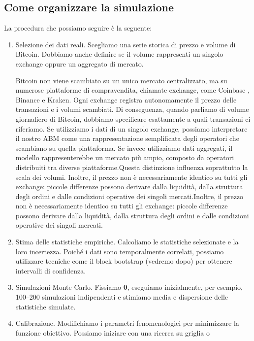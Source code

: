\subsection{Come organizzare la simulazione}
La procedura che possiamo seguire è la seguente:
\begin{enumerate}
    \item Selezione dei dati reali. Scegliamo una serie storica di prezzo e volume di Bitcoin. 
    Dobbiamo anche definire se il volume rappresenti un singolo exchange oppure un aggregato di mercato.
    \begin{approfondimento}
        Bitcoin non viene scambiato su un unico mercato centralizzato, ma su numerose piattaforme di compravendita, chiamate exchange, 
        come Coinbase , Binance e Kraken. Ogni exchange registra autonomamente il prezzo delle transazioni e i volumi scambiati. Di conseguenza, 
        quando parliamo di volume giornaliero di Bitcoin, dobbiamo specificare esattamente a quali transazioni ci riferiamo.
        Se utilizziamo i dati di un singolo exchange, possiamo interpretare il nostro ABM come una rappresentazione semplificata degli operatori che 
        scambiano su quella piattaforma. Se invece utilizziamo dati aggregati, il modello rappresenterebbe un mercato più ampio, composto da 
        operatori distribuiti tra diverse piattaforme.Questa distinzione influenza soprattutto la scala dei volumi.
        Inoltre, il prezzo non è necessariamente identico su tutti gli exchange: piccole differenze possono derivare dalla liquidità, dalla struttura 
        degli ordini e dalle condizioni operative dei singoli mercati.Inoltre, il prezzo non è necessariamente identico su tutti gli exchange: piccole 
        differenze possono derivare dalla liquidità, dalla struttura degli ordini e dalle condizioni operative dei singoli mercati.
    \end{approfondimento}
    \item Stima delle statistiche empiriche. Calcoliamo le statistiche selezionate e la loro incertezza. Poiché i dati sono temporalmente correlati, 
    possiamo utilizzare tecniche come il block bootstrap (vedremo dopo) per ottenere intervalli di confidenza.
    \item Simulazioni Monte Carlo. Fissiamo \(\boldsymbol{\theta}\), eseguiamo inizialmente, per esempio, 100--200 simulazioni indipendenti e 
    stimiamo media e dispersione delle statistiche simulate.
    \item Calibrazione. Modifichiamo i parametri fenomenologici per minimizzare la funzione obiettivo. Possiamo iniziare con una ricerca su griglia o 

\end{enumerate}
